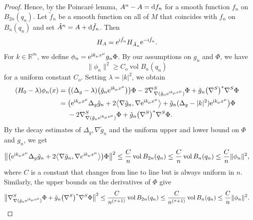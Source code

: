 \documentclass[10pt,a4paper]{amsart}
\numberwithin{equation}{section}
\begin{document}
\begin{proof}
Hence, by the Poincar\'e lemma, $A^n-A={\rm d}f_n$ for a smooth function $f_n$ on $B_{2n}(q_n)$. Let $\tilde{f}_n$ be a smooth function on all of $M$ that coincides with $f_n$ on $B_{n}(q_n)$ and set $\tilde{A}^n=A+{\rm d}\tilde{f}_n$. Then
\[ H_A= {\rm e}^{{\mathrm{i}}\tilde{f}_n} H_{\tilde{A}_n}{\rm e}^{-{\mathrm{i}}\tilde{f}_n}.\]
For $k\in {\mathbb R}^m$, we define $\phi_n= {\rm e}^{{\mathrm{i}}k_\mu x^\mu} {g}_n\Phi$. By our assumptions on $g_n$ and $\Phi$, we have
\begin{equation*}%
\| \phi_n\|^2 \geq C_o \operatorname{vol}  B_{n}(q_n)
\end{equation*}
for a uniform constant $C_o$. Setting $\lambda = |k|^2$, we obtain
\begin{align*} (H_0 -\lambda)\phi_n(x) ={} & \bigl((\Delta_g -\lambda) \bigl(\tilde{g}_n{\rm e}^{{\mathrm{i}}k_\mu x^\mu}\bigr)\bigr) \Phi - 2 \nabla^S_{\nabla (\tilde{g}_n {\rm e}^{{\mathrm{i}}k_\mu x^\mu} )} \Phi + \tilde{g}_n \bigl(\nabla^S\bigr)^*\nabla^S \Phi\\
	={} & \bigl({\rm e}^{{\mathrm{i}}k_\mu x^\mu}\Delta_g \tilde{g}_n + 2\bigl\langle \nabla \tilde{g}_n, \nabla {\rm e}^{{\mathrm{i}}k_\mu x^\mu}\bigr\rangle + \tilde{g}_n (\Delta_g - |k|^2) {\rm e}^{{\mathrm{i}}k_\mu x^\mu} \bigr) \Phi\\&
- 2 \nabla^S_{\nabla (\tilde{g}_n {\rm e}^{{\mathrm{i}}k_\mu x^\mu})} \Phi + \tilde{g}_n \bigl(\nabla^S\bigr)^*\nabla^S \Phi.\end{align*}
By the decay estimates of $\Delta_g, \nabla \tilde{g}_n$ and the uniform upper and lower bound on $\Phi$ and $g_n$, we get
\begin{align*}
\bigl\|\bigl({\rm e}^{{\mathrm{i}}k_\mu x^\mu}\Delta_g \tilde{g}_n + 2\bigl\langle \nabla \tilde{g}_n, \nabla e^{{\mathrm{i}}k_\mu x^\mu}\bigr\rangle \bigr) \Phi\bigr\|^2 \leq \frac{C}{n} \operatorname{vol}  B_{2n}(q_n)\leq \frac{C}{n} \operatorname{vol}  B_{n}(q_n) \leq \frac{C}{n} \| \phi_n\|^2,
\end{align*}
where $C$ is a constant that changes from line to line but is always uniform in $n$. Similarly, the upper bounds on the derivatives of $\Phi$ give
\begin{align*}
\bigl\| \nabla^S_{\nabla  (\tilde{g}_n {\rm e}^{{\mathrm{i}}k_\mu x^\mu} )} \Phi + \tilde{g}_n \bigl(\nabla^S\bigr)^*\nabla^S \Phi \bigr\|^2
\leq \frac{C}{n^{(\tau+1)}} \operatorname{vol}  B_{2n}(q_n)\leq \frac{C}{n^{(\tau+1)}} \operatorname{vol}  B_{n}(q_n) \leq \frac{C}{n} \| \phi_n\|^2.
\end{align*}	

\end{proof}
\end{document}
